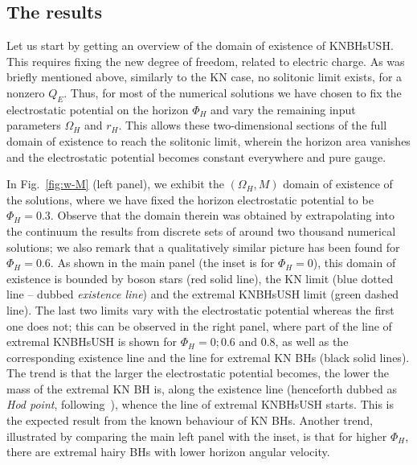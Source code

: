 \subsection{The results }
\label{sec_results_u}

Let us start by getting an overview of the domain of existence of KNBHsUSH. 
This requires fixing the new degree of freedom, related to electric charge. 
As was briefly mentioned above, similarly to the
KN case, no solitonic limit exists, for a nonzero $Q_E$.
Thus, for most of the numerical solutions we have chosen to fix the electrostatic potential on the horizon $\Phi_H$
and vary the remaining  input parameters $\Omega_H$ and $r_H$.
This allows these  two-dimensional sections of the full domain of existence to reach the solitonic limit, 
wherein the horizon area vanishes and the electrostatic potential becomes constant everywhere and pure gauge.


 In Fig.~\ref{fig:w-M} (left panel), 
we exhibit the $(\Omega_H,M)$ domain of existence of the solutions, where we have fixed the horizon electrostatic potential to be $\Phi_H=0.3$. Observe that the domain therein was obtained by extrapolating into the continuum
the results from discrete sets of around two thousand numerical solutions; we also remark that a qualitatively similar picture has been found for $\Phi_H=0.6$.
 As shown in the main panel (the inset is for $\Phi_H=0$), 
this domain of existence is bounded by boson stars (red solid line), 
the KN limit (blue dotted line -- dubbed \textit{existence line}) 
and the extremal KNBHsUSH limit (green dashed line). 
The last two limits vary with the electrostatic potential whereas the first one does not; 
this can be observed in the right panel, where part of the line of extremal KNBHsUSH is shown for $\Phi_H=0; 0.6$ and $0.8$, as well as the corresponding existence line and the line for extremal KN BHs (black solid lines). 
The trend is that the larger the electrostatic potential becomes, the lower the mass of the extremal KN BH is, along the existence line (henceforth dubbed as \textit{Hod point}, following~\cite{Herdeiro:2015tia}), whence the line of extremal KNBHsUSH starts. This is the expected result from the known behaviour of KN BHs. Another trend, illustrated by comparing the main left panel with the inset, is that for higher $\Phi_H$, there are extremal hairy BHs with lower horizon angular velocity.

